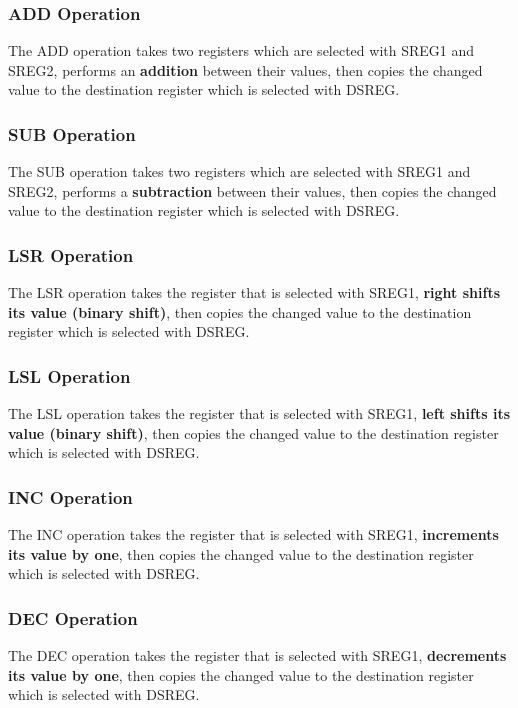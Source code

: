 \documentclass[pdftex,12pt,a4paper]{article}
\begin{document}
\subsubsection{\textbf{ADD} Operation}
The ADD operation takes two registers which are selected with SREG1 and SREG2, performs an \textbf{addition} between their values, then copies the changed value to the destination register which is selected with DSREG. 

\subsubsection{\textbf{SUB} Operation}
The SUB operation takes two registers which are selected with SREG1 and SREG2, performs a \textbf{subtraction} between their values, then copies the changed value to the destination register which is selected with DSREG. 

\subsubsection{\textbf{LSR} Operation}
The LSR operation takes the register that is selected with SREG1, \textbf{right shifts its value (binary shift)}, then copies the changed value to the destination register which is selected with DSREG.

\subsubsection{\textbf{LSL} Operation}
The LSL operation takes the register that is selected with SREG1, \textbf{left shifts its value (binary shift)}, then copies the changed value to the destination register which is selected with DSREG.

\subsubsection{\textbf{INC} Operation}
The INC operation takes the register that is selected with SREG1, \textbf{increments its value by one}, then copies the changed value to the destination register which is selected with DSREG.

\subsubsection{\textbf{DEC} Operation}
The DEC operation takes the register that is selected with SREG1, \textbf{decrements its value by one}, then copies the changed value to the destination register which is selected with DSREG.
\end{document}
